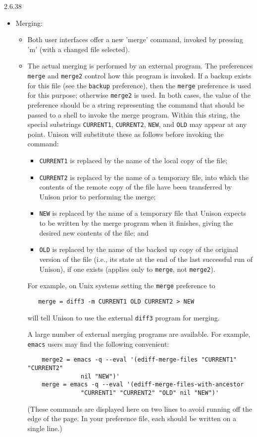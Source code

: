 \begin{changesfromversion}{2.6.38}
\begin{itemize}
\item Merging:
\begin{itemize}
  \item Both user interfaces offer a new 'merge' command, invoked by pressing
      'm' (with a changed file selected).
  \item The actual merging is performed by an external program.
      The preferences \verb|merge| and \verb|merge2| control how this
      program is invoked.  If a backup exists for this file (see the
      \verb|backup| preference), then the \verb|merge| preference is used for
      this purpose; otherwise \verb|merge2| is used.  In both cases, the
      value of the preference should be a string representing the command
      that should be passed to a shell to invoke the
      merge program.  Within this string, the special substrings
      \verb|CURRENT1|, \verb|CURRENT2|, \verb|NEW|,  and \verb|OLD| may appear
      at any point.  Unison will substitute these as follows before invoking
      the command:
        \begin{itemize}
        \item \relax\verb|CURRENT1| is replaced by the name of the local
        copy of the file;
        \item \relax\verb|CURRENT2| is replaced by the name of a temporary
        file, into which the contents of the remote copy of the file have
        been transferred by Unison prior to performing the merge;
        \item \relax\verb|NEW| is replaced by the name of a temporary
        file that Unison expects to be written by the merge program when
        it finishes, giving the desired new contents of the file; and
        \item \relax\verb|OLD| is replaced by the name of the backed up
        copy of the original version of the file (i.e., its state at the
        end of the last successful run of Unison), if one exists
        (applies only to \verb|merge|, not \verb|merge2|).
        \end{itemize}
      For example, on Unix systems setting the \verb|merge| preference to
\begin{verbatim}
   merge = diff3 -m CURRENT1 OLD CURRENT2 > NEW
\end{verbatim}
      will tell Unison to use the external \verb|diff3| program for merging.

      A large number of external merging programs are available.  For
      example, \verb|emacs| users may find the following convenient:
\begin{verbatim}
    merge2 = emacs -q --eval '(ediff-merge-files "CURRENT1" "CURRENT2"
               nil "NEW")'
    merge = emacs -q --eval '(ediff-merge-files-with-ancestor
               "CURRENT1" "CURRENT2" "OLD" nil "NEW")'
\end{verbatim}
(These commands are displayed here on two lines to avoid running off the
edge of the page.  In your preference file, each should be written on a
single line.)


\end{itemize}
\end{itemize}
\end{changesfromversion}
